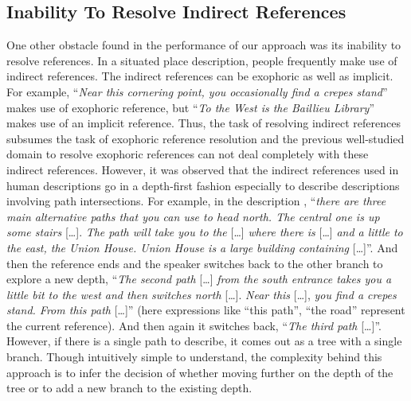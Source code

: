 \documentclass{acm_proc_article-sp}
\begin{document}
\subsection{Inability To Resolve Indirect References}
One other obstacle found in the performance of our approach was its inability to resolve references.
In a situated place description, people frequently make use of indirect references. The
indirect references can be exophoric as well as implicit. For example, ``\textit{Near this cornering point, you occasionally find a crepes stand}''
 makes use of exophoric reference, but ``\textit{To the West is the Baillieu Library}'' makes use of an implicit reference. Thus,
the task of resolving indirect references subsumes the task of exophoric reference resolution and
the previous well-studied domain to resolve exophoric references can not deal completely with these indirect references.
However, it was observed that the indirect references used in human descriptions go in a
depth-first fashion especially to describe descriptions involving path intersections. 
For example, in the description , ``\textit{there are three main
alternative paths that you can use to head north. The central one is up
some stairs} {[}\dots{]}. \textit{The path will take you to the} {[}\dots{]} \textit{where there
is} {[}\dots{]} \textit{and a little to the east, the Union House. Union House is a
large building containing} {[}\dots{]}''. And then the reference ends and the
speaker switches back to the other branch to explore a new depth,
``\textit{The second path} {[}\dots{]} \textit{from the south entrance takes you a little
bit to the west and then switches north} {[}\dots{]}. \textit{Near this} {[}\dots{]},
\textit{you find a crepes stand. From this path }{[}\dots{]}'' (here expressions like
``this path'', ``the road'' represent the current reference). And then
again it switches back, ``\textit{The third path} {[}\dots{]}''.
However, if there is a single path to describe, it comes out as a tree with a single branch.
Though intuitively simple to understand, the complexity behind this approach is to infer the decision of whether moving further on the depth
of the tree or to add a new branch to the existing depth.
\end{document}
